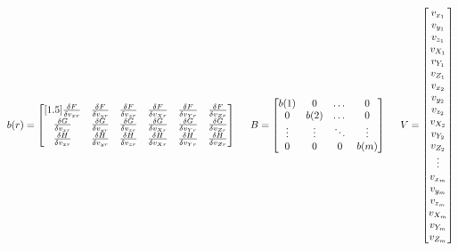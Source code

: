 \[
b(r) = 
\begin{bmatrix}[1.5]
\frac{\delta F}{\delta v_{xr}} & \frac{\delta F}{\delta v_{yr}} & \frac{\delta F}{\delta v_{zr}} & \frac{\delta F}{\delta v_{Xr}} & \frac{\delta F}{\delta v_{Yr}} & \frac{\delta F}{\delta v_{Zr}} \\
\frac{\delta G}{\delta v_{xr}} & \frac{\delta G}{\delta v_{yr}} & \frac{\delta G}{\delta v_{zr}} & \frac{\delta G}{\delta v_{Xr}} & \frac{\delta G}{\delta v_{Yr}} & \frac{\delta G}{\delta v_{Zr}} \\
\frac{\delta H}{\delta v_{xr}} & \frac{\delta H}{\delta v_{yr}} & \frac{\delta H}{\delta v_{zr}} & \frac{\delta H}{\delta v_{Xr}} & \frac{\delta H}{\delta v_{Yr}} & \frac{\delta H}{\delta v_{Zr}}
\end{bmatrix}
\hspace{0.5cm}
B = 
\begin{bmatrix}
b(1) & 0 & \dots & 0 \\
0 & b(2) & \dots & 0 \\
\vdots & \vdots & \ddots & \vdots \\
0 & 0 & 0 & b(m) \\
\end{bmatrix}
\hspace{0.5cm}
V = 
\begin{bmatrix}
v_{x_1} \\
v_{y_1} \\
v_{z_1} \\
v_{X_1} \\
v_{Y_1} \\
v_{Z_1} \\
v_{x_2} \\
v_{y_2} \\
v_{z_2} \\
v_{X_2} \\
v_{Y_2} \\
v_{Z_2} \\
\vdots \\
v_{x_m} \\
v_{y_m} \\
v_{z_m} \\
v_{X_m} \\
v_{Y_m} \\
v_{Z_m}
\end{bmatrix}
\]

